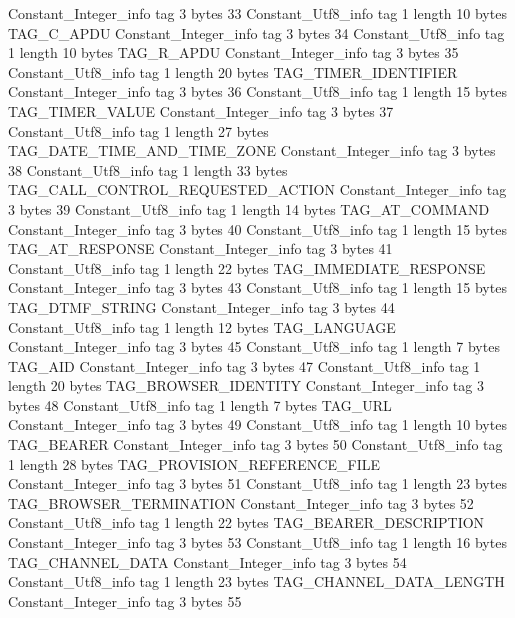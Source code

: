 {{{		}
		Constant_Integer_info {
			tag	3
			bytes	33
		}
		Constant_Utf8_info {
			tag	1
			length	10
			bytes	TAG_C_APDU
		}
		Constant_Integer_info {
			tag	3
			bytes	34
		}
		Constant_Utf8_info {
			tag	1
			length	10
			bytes	TAG_R_APDU
		}
		Constant_Integer_info {
			tag	3
			bytes	35
		}
		Constant_Utf8_info {
			tag	1
			length	20
			bytes	TAG_TIMER_IDENTIFIER
		}
		Constant_Integer_info {
			tag	3
			bytes	36
		}
		Constant_Utf8_info {
			tag	1
			length	15
			bytes	TAG_TIMER_VALUE
		}
		Constant_Integer_info {
			tag	3
			bytes	37
		}
		Constant_Utf8_info {
			tag	1
			length	27
			bytes	TAG_DATE_TIME_AND_TIME_ZONE
		}
		Constant_Integer_info {
			tag	3
			bytes	38
		}
		Constant_Utf8_info {
			tag	1
			length	33
			bytes	TAG_CALL_CONTROL_REQUESTED_ACTION
		}
		Constant_Integer_info {
			tag	3
			bytes	39
		}
		Constant_Utf8_info {
			tag	1
			length	14
			bytes	TAG_AT_COMMAND
		}
		Constant_Integer_info {
			tag	3
			bytes	40
		}
		Constant_Utf8_info {
			tag	1
			length	15
			bytes	TAG_AT_RESPONSE
		}
		Constant_Integer_info {
			tag	3
			bytes	41
		}
		Constant_Utf8_info {
			tag	1
			length	22
			bytes	TAG_IMMEDIATE_RESPONSE
		}
		Constant_Integer_info {
			tag	3
			bytes	43
		}
		Constant_Utf8_info {
			tag	1
			length	15
			bytes	TAG_DTMF_STRING
		}
		Constant_Integer_info {
			tag	3
			bytes	44
		}
		Constant_Utf8_info {
			tag	1
			length	12
			bytes	TAG_LANGUAGE
		}
		Constant_Integer_info {
			tag	3
			bytes	45
		}
		Constant_Utf8_info {
			tag	1
			length	7
			bytes	TAG_AID
		}
		Constant_Integer_info {
			tag	3
			bytes	47
		}
		Constant_Utf8_info {
			tag	1
			length	20
			bytes	TAG_BROWSER_IDENTITY
		}
		Constant_Integer_info {
			tag	3
			bytes	48
		}
		Constant_Utf8_info {
			tag	1
			length	7
			bytes	TAG_URL
		}
		Constant_Integer_info {
			tag	3
			bytes	49
		}
		Constant_Utf8_info {
			tag	1
			length	10
			bytes	TAG_BEARER
		}
		Constant_Integer_info {
			tag	3
			bytes	50
		}
		Constant_Utf8_info {
			tag	1
			length	28
			bytes	TAG_PROVISION_REFERENCE_FILE
		}
		Constant_Integer_info {
			tag	3
			bytes	51
		}
		Constant_Utf8_info {
			tag	1
			length	23
			bytes	TAG_BROWSER_TERMINATION
		}
		Constant_Integer_info {
			tag	3
			bytes	52
		}
		Constant_Utf8_info {
			tag	1
			length	22
			bytes	TAG_BEARER_DESCRIPTION
		}
		Constant_Integer_info {
			tag	3
			bytes	53
		}
		Constant_Utf8_info {
			tag	1
			length	16
			bytes	TAG_CHANNEL_DATA
		}
		Constant_Integer_info {
			tag	3
			bytes	54
		}
		Constant_Utf8_info {
			tag	1
			length	23
			bytes	TAG_CHANNEL_DATA_LENGTH
		}
		Constant_Integer_info {
			tag	3
			bytes	55
		}
}}
